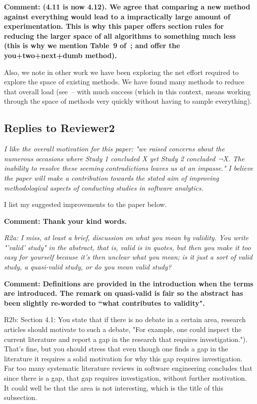 \documentclass[preprint,10pt]{elsarticle}
\begin{document}
{\bf Comment: (4.11 is now 4.12). We agree that comparing a new method against 
everything would lead to a impractically large amount of experimentation.
This is why this paper offers section rules for reducing the larger space of 
all algorithms to something much less (this is why we  mention
Table~9 of~\cite{ghotra2015}; and offer the you+two+next+dumb method).

Also, we note in other work we have been exploring the net effort required
to explore the space of existing methods. We have found many methods to reduce
that overall load (see~\cite{Fu16,chen2018,AgrawalM17}-- with much success
(which in this context, means working through the space of methods
very quickly without having to sample everything).
}



\subsection*{Replies to Reviewer2}

{\em 
I like the overall motivation for this paper: "we raised concerns about the numerous occasions where Study 1 concluded X yet Study 2 concluded ¬X. The inability to resolve these seeming contradictions leaves us at an impasse." I believe the paper will make a contribution towards the stated aim of improving methodological aspects of conducting studies in software analytics.

I list my suggested improvements to the paper below.}

{\bf Comment: Thank your kind words. }

{\em 
R2a: I miss, at least a brief, discussion on what you mean by validity. You write "'valid' study" in the abstract, that is, valid is in quotes, but then you make it too easy for yourself because it's then unclear what you mean; is it just a sort of valid study, a quasi-valid study, or do you mean valid study? }

{\bf Comment:  Definitions are provided in the introduction when the terms are introduced.  The remark on quasi-valid is fair so the abstract has been slightly re-worded to ``what contributes to validity".
}

{\em

R2b: Section 4.1: You state that if there is no debate in a certain area, research articles should motivate to such a debate, "For example, one could inspect the current literature and report a gap in the research that requires investigation."). That's fine, but you should stress that even though one finds a gap in the literature it requires a solid motivation for why this gap requires investigation. Far too many systematic literature reviews in software engineering concludes that since there is a gap, that gap requires investigation, without further motivation. It could well be that the area is not interesting, which is the title of this subsection.

}
\end{document}
